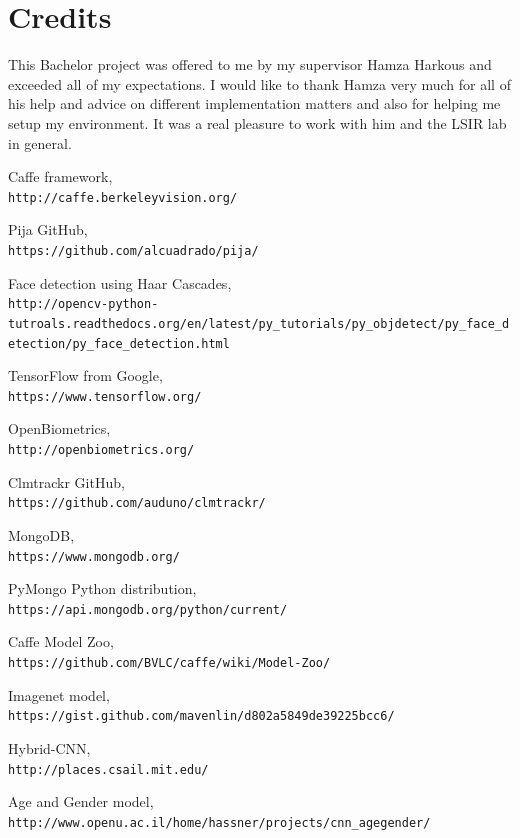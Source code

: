 \documentclass{article}
\begin{document}
\section{Credits}
This Bachelor project was offered to me by my supervisor Hamza Harkous and exceeded all of my expectations. I would like to thank Hamza very much for all of his help and advice on different implementation matters and also for helping me setup my environment. It was a real pleasure to work with him and the LSIR lab in general.
\newpage
\begin{thebibliography}{20}
Caffe framework,
\\\texttt{http://caffe.berkeleyvision.org/}
 
Pija GitHub,
\\\texttt{https://github.com/alcuadrado/pija/}
 
Face detection using Haar Cascades,
\\\texttt{http://opencv-python-tutroals.readthedocs.org/en/latest/py\_tutorials/py\_objdetect/py\_face\_detection/py\_face\_detection.html}

TensorFlow from Google,
\\\texttt{https://www.tensorflow.org/}

OpenBiometrics,
\\\texttt{http://openbiometrics.org/}

Clmtrackr GitHub,
\\\texttt{https://github.com/auduno/clmtrackr/}

MongoDB,
\\\texttt{https://www.mongodb.org/}

PyMongo Python distribution,
\\\texttt{https://api.mongodb.org/python/current/}

Caffe Model Zoo,
\\\texttt{https://github.com/BVLC/caffe/wiki/Model-Zoo/}

Imagenet model,
\\\texttt{https://gist.github.com/mavenlin/d802a5849de39225bcc6/}

Hybrid-CNN,
\\\texttt{http://places.csail.mit.edu/}

Age and Gender model,
\\\texttt{http://www.openu.ac.il/home/hassner/projects/cnn\_agegender/}


\end{thebibliography}
\end{document}
